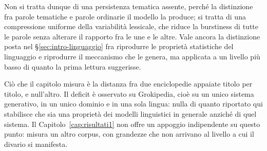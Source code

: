 Non si tratta dunque di una persistenza tematica assente, perché la distinzione
fra parole tematiche e parole ordinarie il modello la produce; si tratta di una
compressione uniforme della variabilità lessicale, che riduce la burstiness di
tutte le parole senza alterare il rapporto fra le une e le altre. Vale ancora la
distinzione posta nel §\ref{sec:intro-linguaggio} fra riprodurre le proprietà
statistiche del linguaggio e riprodurre il meccanismo che le genera, ma
applicata a un livello più basso di quanto la prima lettura suggerisse.

Ciò che il capitolo misura è la distanza fra due enciclopedie appaiate titolo
per titolo, e null'altro. Il deficit è osservato su Grokipedia, cioè su un unico
sistema generativo, in un unico dominio e in una sola lingua: nulla di quanto
riportato qui stabilisce che sia una proprietà dei modelli linguistici in
generale anziché di quel sistema. Il Capitolo~\ref{cap:risultati1} non offre un
appoggio indipendente su questo punto: misura un altro corpus, con grandezze
che non arrivano al livello a cui il divario si manifesta.
